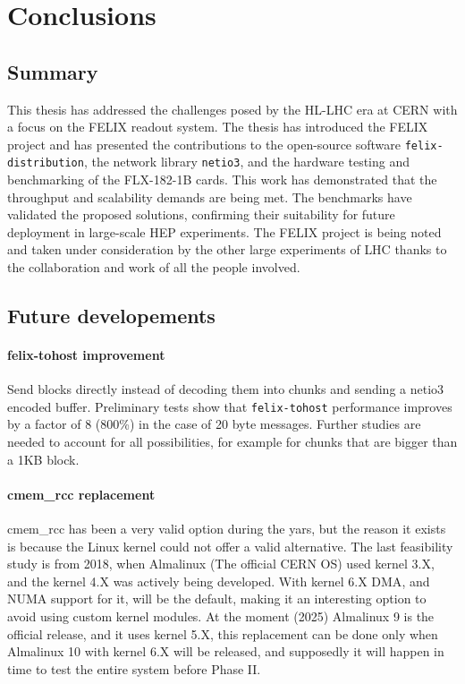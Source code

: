 \chapter{Conclusions}

\section{Summary}
This thesis has addressed the challenges posed by the \acl{HL-LHC} era at \acs{CERN} with a focus on the \acs{FELIX} readout system. The thesis has introduced the \acs{FELIX} project and has presented the contributions to the open-source software \texttt{felix-distribution}, the network library \texttt{netio3}, and the hardware testing and benchmarking of the FLX-182-1B cards. This work has demonstrated that the throughput and scalability demands are being met. The benchmarks have validated the proposed solutions, confirming their suitability for future deployment in large-scale \acs{HEP} experiments. The \acs{FELIX} project is being noted and taken under consideration by the other large experiments of \acs{LHC} thanks to the collaboration and work of all the people involved.

\section{Future developements}

\subsubsection{felix-tohost improvement}
\label{subsec:felix-tohost-improvement}

Send blocks directly instead of decoding them into chunks and sending a netio3 encoded buffer. Preliminary tests show that \texttt{felix-tohost} performance improves by a factor of 8 (800\%) in the case of 20 byte messages. Further studies are needed to account for all possibilities, for example for chunks that are bigger than a 1KB block.

\subsubsection{cmem\_rcc replacement}

cmem\_rcc has been a very valid option during the yars, but the reason it exists is because the Linux kernel could not offer a valid alternative. The last feasibility study is from 2018, when Almalinux (The official \acs{CERN} OS) used kernel 3.X, and the kernel 4.X was actively being developed. With kernel 6.X \acs{DMA}, and NUMA support for it, will be the default, making it an interesting option to avoid using custom kernel modules. At the moment (2025) Almalinux 9 is the official release, and it uses kernel 5.X, this replacement can be done only when Almalinux 10 with kernel 6.X will be released, and supposedly it will happen in time to test the entire system before Phase II.

